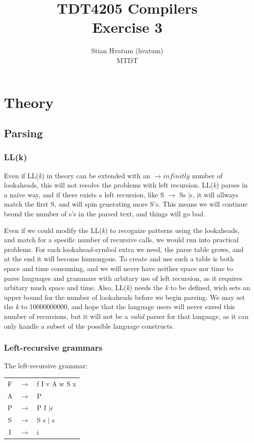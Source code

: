 \documentclass{article}
\title{TDT4205 Compilers\\
\Huge Exercise 3}
\author{Stian Hvatum (hvatum)\\MTDT}
\begin{document}
\maketitle

\section{Theory}
\subsection{Parsing}
\subsubsection{LL(k)}
Even if LL(\textit{k}) in theory can be extended with an $\rightarrow infinitly$
number of lookaheads, this will not resolve the problems with left recursion.
LL(\textit{k}) parses in a naive way, and if there exists a left recursion, like
S $\rightarrow$ Ss $| \epsilon$, it will allways match the first S, and will spin
generating more S's. This means we will continue beond the number of s's in the
parsed text, and things will go bad.

Even if we could modify the LL(\textit{k})  to recognize patterns using the
lookaheads, and match for a spesific number of recursive calls, we would run
into practical problems. For each lookahead-symbol extra we need, the parse
table grows, and at the end it will become humongous. To create and use such a
table is both space and time consuming, and we will never have neither space
nor time to parse languages and grammars with arbitary use of left recursion,
as it requires arbitary much space and time. Also, LL(\textit{k}) needs the
\textit{k} to be defined, wich sets an upper bound for the number of lookaheads
before we begin parsing. We may set the \textit{k} to 10000000000, and hope
that the language users will never exeed this number of recursions, but it will
not be a \emph{valid} parser for that language, as it can only handle a subset of
the possible language constructs.
\subsubsection{Left-recursive grammars}
The left-recursive grammar:\\
\begin{tabular}{ccl}
F & $\rightarrow$ & f I v A w S x \\ 
A & $\rightarrow$ & P \\
P & $\rightarrow$ & P I $| \epsilon$\\ 
S & $\rightarrow$ & S s $|$ s\\
I & $\rightarrow$ & i\\
\end{tabular}
\end{document}
